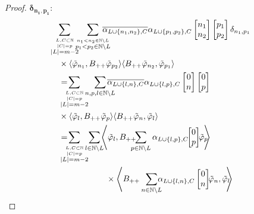 \documentclass[b5paper,draft,openbib,12pt]{memoir}
\begin{document}
\begin{proof}
\(\boldsymbol{\delta_{n_1,p_1}:}\) 
\begin{align}
  &\hspace{-0.4cm}\sum_{\overset{L,C\subset \mathbb{N}}{\overset{|C|=p}{|L|=m-2}}}\hspace{-0.2cm}\sum_{\overset{n_1<n_2\in\mathbb{N}\backslash L }{p_1<p_2\in\mathbb{N}\backslash L }}
  \hspace{-0.4cm}\overline{\alpha_{L\cup\{n_1,n_2\},C}}\alpha_{L\cup\{p_1,p_2\},C}
\left[\begin{matrix}n_1\\n_2\end{matrix}\right]\left[\begin{matrix}p_1\\p_2\end{matrix}\right]\delta_{n_1,p_1}\\
    &\times 
    \langle \tilde{\varphi}_{n_1},B_{++}\tilde{\varphi}_{p_2} \rangle \langle B_{++} \tilde{\varphi}_{n_2}, \tilde{\varphi}_{p_1}\rangle\\
  &=\hspace{-0.4cm}\sum_{\overset{L,C\subset \mathbb{N}}{\overset{|C|=p}{|L|=m-2}}}\hspace{-0.2cm}\sum_{n,p,l \in\mathbb{N}\backslash L }
  \hspace{-0.4cm}\overline{\alpha_{L\cup\{l,n\},C}}\alpha_{L\cup\{l,p\},C}
\left[\begin{matrix}0\\n\end{matrix}\right]\left[\begin{matrix}0\\p\end{matrix}\right]\\
    &\times 
    \langle \tilde{\varphi}_{l},B_{++}\tilde{\varphi}_{p} \rangle \langle B_{++} \tilde{\varphi}_{n}, \tilde{\varphi}_{l}\rangle\\
    &=
  \hspace{-0.4cm}\sum_{\overset{L,C\subset \mathbb{N}}{\overset{|C|=p}{|L|=m-2}}}\hspace{-0.2cm}\sum_{l \in\mathbb{N}\backslash L }
\!\!\!\left\langle \tilde{\varphi}_{l} ,B_{++}\!\!\!\!\!\sum_{p\in\mathbb{N}\backslash L}\alpha_{L\cup \{l,p\},C}\!\!\left[\begin{matrix}0\\p\end{matrix}\right]\!\! \tilde{\varphi}_{p}  \!\!\!\right\rangle\\
&\hspace{2cm}\times \left\langle B_{++}\sum_{n\in\mathbb{N}\backslash L}\!\!\!\!\alpha_{L\cup \{l,n\},C}\left[\begin{matrix}0\\n\end{matrix}\right] \!\!\tilde{\varphi}_{n} , \tilde{\varphi}_{l}  \!\!\!\right\rangle\\

\end{align}
\end{proof}
\end{document}
